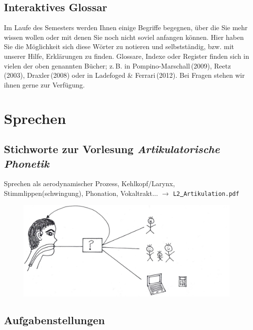 \documentclass[11pt]{book}
\begin{document}
\section{Interaktives Glossar}

Im Laufe des Semesters werden Ihnen einige Begriffe begegnen, über die Sie mehr wissen wollen oder mit denen Sie noch nicht soviel anfangen können. Hier haben Sie die Möglichkeit sich diese Wörter zu notieren und selbstständig, bzw. mit unserer Hilfe, Erklärungen zu finden. Glossare, Indexe oder Register finden sich in vielen der oben genannten Bücher; z.\,B. in Pompino-Marschall\,(2009), Reetz\,(2003), Draxler\,(2008) oder in Ladefoged \& Ferrari\,(2012). Bei Fragen stehen wir ihnen gerne zur Verfügung.  





\chapter{Sprechen}

\section{Stichworte zur Vorlesung \em{Artikulatorische Phonetik}} 

Sprechen als aerodynamischer Prozess, Kehlkopf/Larynx, Stimmlippen(schwingung), Phonation, Vokaltrakt... $\rightarrow$ {\tt L2\underline{\ }Artikulation.pdf}

\begin{figure}[htbp]
\begin{center}
\includegraphics[width=\textwidth]{grafiken/sprechen/sprechen}
\label{t1}
\end{center}
\end{figure}



\section{Aufgabenstellungen}
\end{document}
